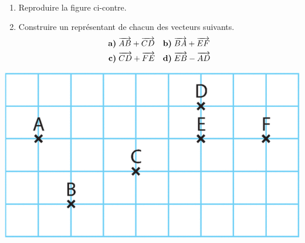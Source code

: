 \documentclass[11pt]{article}
\begin{document}
\begin{exo}~\\[-4mm]
  \begin{minipage}[]{.4\textwidth}
    \begin{enumerate}
      \item Reproduire la figure ci-contre.
      \item Construire un représentant de chacun des vecteurs suivants.
        \begin{align*}
          \textbf{a)}\;& \overrightarrow{AB}+\overrightarrow{CD} &
          \textbf{b)}\;& \overrightarrow{BA}+\overrightarrow{EF} \\
          \textbf{c)}\;& \overrightarrow{CD}+\overrightarrow{FE} &
          \textbf{d)}\;& \overrightarrow{EB}-\overrightarrow{AD}
        \end{align*}
    \end{enumerate}
  \end{minipage}
  \begin{minipage}[]{.6\textwidth}
    \begin{center}
      \includegraphics[scale=.25]{quad2.png}
    \end{center}
  \end{minipage}
\end{exo}
\end{document}
